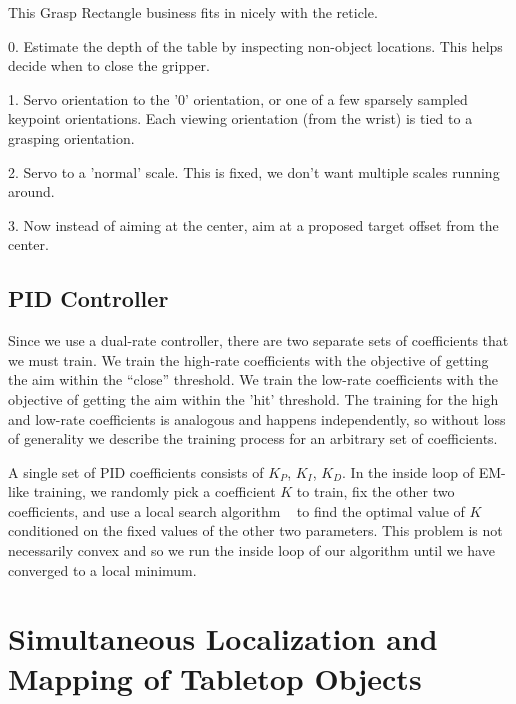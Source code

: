 
This Grasp Rectangle business fits in nicely with the reticle.

0. Estimate the depth of the table by inspecting non-object locations. This helps decide when to close the gripper.

1. Servo orientation to the '0' orientation, or one of a few sparsely sampled keypoint orientations.
Each viewing orientation (from the wrist) is tied to a grasping orientation.

2. Servo to a 'normal' scale. This is fixed, we don't want multiple scales running around.

3. Now instead of aiming at the center, aim at a proposed target offset from the center.


\subsection{PID Controller}
Since we use a dual-rate controller, there are two separate sets of coefficients that we must train.
We train the high-rate coefficients with the objective of getting the aim within the ``close'' threshold.
We train the low-rate coefficients with the objective of getting the aim within the 'hit' threshold.
The training for the high and low-rate coefficients is analogous and happens independently, so
without loss of generality we describe the training process for an arbitrary set of coefficients.

A single set of PID coefficients consists of $K_P$, $K_I$, $K_D$. In the inside loop of EM-like training, we
randomly pick a coefficient $K$ to train, fix the other two coefficients,  and use a local search 
algorithm ~\citep{} to find the optimal value of $K$ conditioned on the fixed values of the other two
parameters. This problem is not necessarily convex and so we run the inside loop of our algorithm
until we have converged to a local minimum.


\section{Simultaneous Localization and Mapping of Tabletop Objects}

